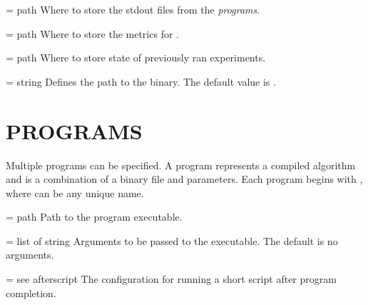 \documentclass[a4paper,english]{article}
\begin{document}
\begin{adjustwidth}{18pt}{0pt}
    \begin{Description}[Options]\setlength{\itemsep}{0cm}
        \item[\Opt{output\_path} = path]
            Where to store the stdout files from the \emph{programs}.
        \item[\Opt{metrics\_path} = path]
            Where to store the metrics for  .
        \item[\Opt{experiments\_folder} = path]
            Where to store state of previously ran experiments.
        \item[\oOpt{wrapper} = string]
            Defines the path to the  binary.
            The default value is .
    \end{Description}


%
%


    \section{PROGRAMS}

      Multiple programs can be specified.
      A program represents a compiled algorithm and is a combination of a binary file and parameters.
      Each program begins with , where  can be any unique name.

      \begin{Description}[Options]\setlength{\itemsep}{0cm}
          \item[\Opt{binary} = path]
            Path to the program executable.
          \item[\oOpt{arguments} = list of string]
            Arguments to be passed to the executable.
            The default is no arguments.
          \item[\oOpt{afterscript} = see afterscript]
            The configuration for running a short script after program completion.
      \end{Description}


\end{adjustwidth}
\end{document}
